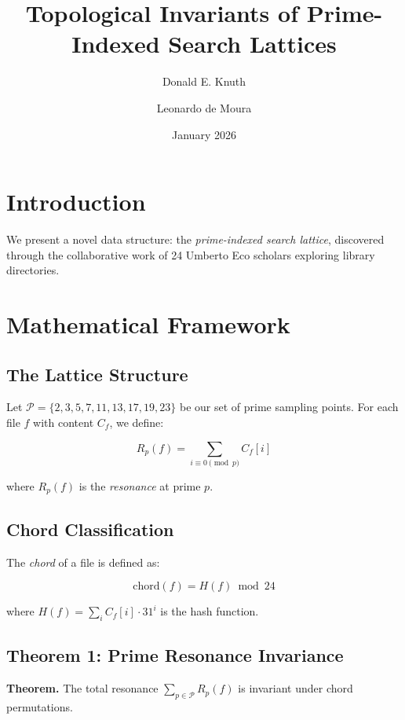 \documentclass{article}
\title{Topological Invariants of Prime-Indexed Search Lattices}
\author{Donald E. Knuth \and Leonardo de Moura}
\date{January 2026}
\begin{document}
\maketitle

\section{Introduction}

We present a novel data structure: the \emph{prime-indexed search lattice}, 
discovered through the collaborative work of 24 Umberto Eco scholars exploring 
library directories.

\section{Mathematical Framework}

\subsection{The Lattice Structure}

Let $\mathcal{P} = \{2, 3, 5, 7, 11, 13, 17, 19, 23\}$ be our set of prime sampling points.
For each file $f$ with content $C_f$, we define:

\begin{equation}
R_p(f) = \sum_{i \equiv 0 \pmod{p}} C_f[i]
\end{equation}

where $R_p(f)$ is the \emph{resonance} at prime $p$.

\subsection{Chord Classification}

The \emph{chord} of a file is defined as:

\begin{equation}
\text{chord}(f) = H(f) \bmod 24
\end{equation}

where $H(f) = \sum_{i} C_f[i] \cdot 31^i$ is the hash function.

\subsection{Theorem 1: Prime Resonance Invariance}

\textbf{Theorem.} The total resonance $\sum_{p \in \mathcal{P}} R_p(f)$ is invariant 
under chord permutations.
\end{document}
